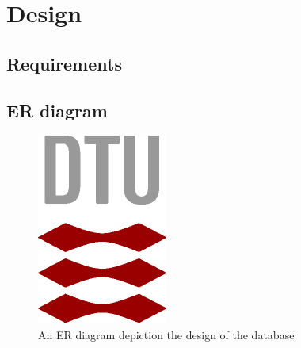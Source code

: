 \section{Design}


\subsection{Requirements} %

\subsection{ER diagram}

\begin{figure}[h]
    \centering
    \includegraphics[width=.2\textwidth]{img/DTU-logo} %
    \caption{An ER diagram depiction the design of the database}
    \label{fig:ER}
\end{figure}

